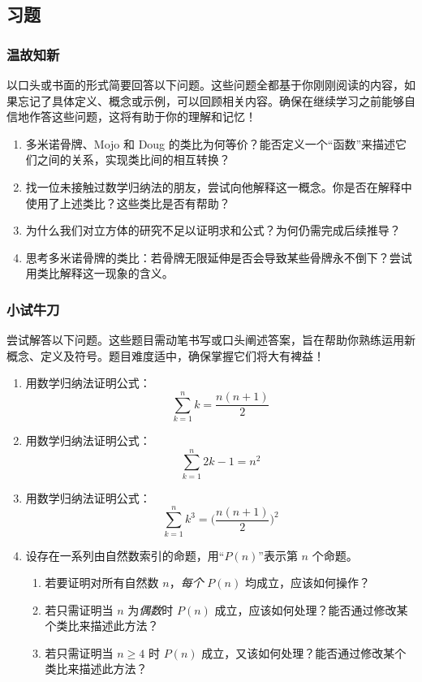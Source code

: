 \subsection{习题}\label{sec:section2.3.4}

\subsubsection*{温故知新}

以口头或书面的形式简要回答以下问题。这些问题全都基于你刚刚阅读的内容，如果忘记了具体定义、概念或示例，可以回顾相关内容。确保在继续学习之前能够自信地作答这些问题，这将有助于你的理解和记忆！

\begin{enumerate}[label=(\arabic*)]
    \item 多米诺骨牌、Mojo 和 Doug 的类比为何等价？能否定义一个``函数''来描述它们之间的关系，实现类比间的相互转换？
    \item 找一位未接触过数学归纳法的朋友，尝试向他解释这一概念。你是否在解释中使用了上述类比？这些类比是否有帮助？
    \item 为什么我们对立方体的研究不足以证明求和公式？为何仍需完成后续推导？
    \item 思考多米诺骨牌的类比：若骨牌无限延伸是否会导致某些骨牌永不倒下？尝试用类比解释这一现象的含义。
\end{enumerate}

\subsubsection*{小试牛刀}

尝试解答以下问题。这些题目需动笔书写或口头阐述答案，旨在帮助你熟练运用新概念、定义及符号。题目难度适中，确保掌握它们将大有裨益！

\begin{enumerate}[label=(\arabic*)]
    \item 用数学归纳法证明公式：
    \[\sum_{k=1}^{n}k = \frac{n(n+1)}{2}\]
    \item 用数学归纳法证明公式：
    \[\sum_{k=1}^{n}2k-1 = n^2\]
    \item 用数学归纳法证明公式：
    \[\sum_{k=1}^{n}k^3 = \Bigg(\frac{n(n+1)}{2}\Bigg)^2\]
    \item 设存在一系列由自然数索引的命题，用``$P(n)$''表示第 $n$ 个命题。
    \begin{enumerate}[label=(\alph*)]
        \item 若要证明对所有自然数 $n$，\emph{每个} $P(n)$ 均成立，应该如何操作？
        \item 若只需证明当 $n$ 为\emph{偶数}时 $P(n)$ 成立，应该如何处理？能否通过修改某个类比来描述此方法？
        \item 若只需证明当 $n \geq 4$ 时 $P(n)$ 成立，又该如何处理？能否通过修改某个类比来描述此方法？
    \end{enumerate}
\end{enumerate}
